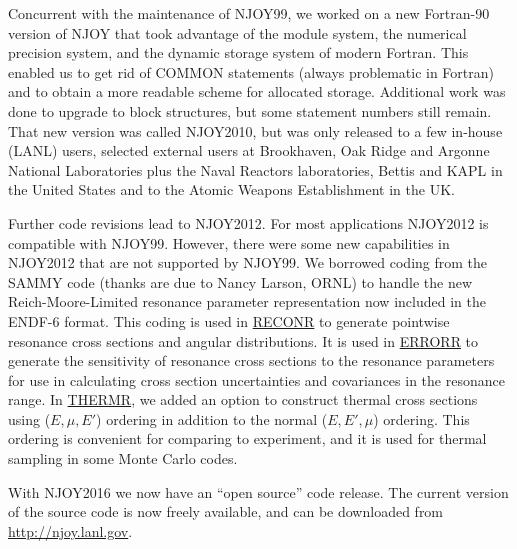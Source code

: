 Concurrent with the maintenance of NJOY99, we worked
on a new Fortran-90 version of NJOY that took advantage of the
module system, the numerical precision system, and the dynamic storage
system of modern Fortran.  This enabled us to get rid of COMMON statements
(always problematic in Fortran) and to obtain a more readable
scheme for allocated storage.  Additional work was done to upgrade
to block structures, but some statement numbers still remain.
That new version was called NJOY2010, but was only
released to a few in-house (LANL) users, selected external users
at Brookhaven, Oak Ridge and Argonne National Laboratories plus the
Naval Reactors laboratories, Bettis and KAPL in the United States and to
the Atomic Weapons Establishment in the UK.

Further code revisions
lead to NJOY2012\cite{NJ12}.  For most
applications NJOY2012 is compatible
with NJOY99.  However, there were some new capabilities in NJOY2012
that are not supported by NJOY99.  We borrowed coding from the
SAMMY\cite{SAMMY} code (thanks are due to Nancy Larson,
ORNL) to handle the new Reich-Moore-Limited resonance parameter
representation now included in the ENDF-6 format.  This coding
is used in \hyperlink{sRECONRhy}{RECONR} to
generate pointwise resonance cross sections and angular
distributions.  It is used in \hyperlink{sERRORRhy}{ERRORR}
 to generate the sensitivity of resonance
cross sections to the resonance parameters for use in
calculating cross section uncertainties and covariances in the
resonance range.  In \hyperlink{sTHERMRhy}{THERMR},
we added an option to construct thermal cross sections using ($E,\mu,E'$)
ordering in addition to the normal ($E,E',\mu$) ordering.  This
ordering is convenient for comparing to experiment, and it is used
for thermal sampling in some Monte Carlo codes.

With NJOY2016 we now have an ``open source'' code release.  The
current version of the source code is now freely available, and can be
downloaded from \href{http://njoy.lanl.gov}{http://njoy.lanl.gov}.

\cleardoublepage

